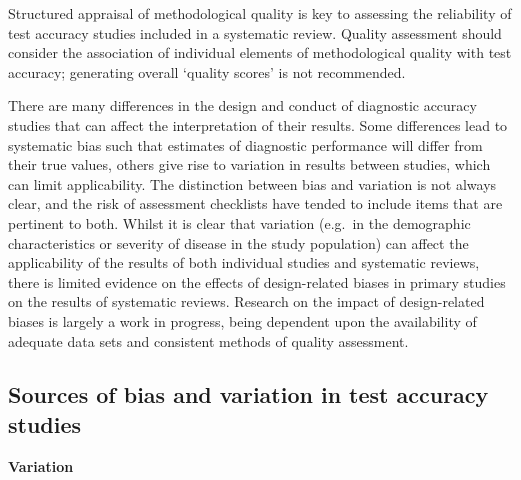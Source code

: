 \documentclass[
  11pt,
  a4paper,
  DIV=11,
  numbers=noendperiod]{scrreprt}
\begin{document}
Structured appraisal of methodological quality is key to assessing the
reliability of test accuracy studies included in a systematic review.
Quality assessment should consider the association of individual
elements of methodological quality with test accuracy; generating
overall `quality scores' is not recommended.

There are many differences in the design and conduct of diagnostic
accuracy studies that can affect the interpretation of their results.
Some differences lead to systematic bias such that estimates of
diagnostic performance will differ from their true values, others give
rise to variation in results between studies, which can limit
applicability. The distinction between bias and variation is not always
clear, and the risk of assessment checklists have tended to include
items that are pertinent to both. Whilst it is clear that variation
(e.g.~in the demographic characteristics or severity of disease in the
study population) can affect the applicability of the results of both
individual studies and systematic reviews, there is limited evidence on
the effects of design-related biases in primary studies on the results
of systematic reviews. Research on the impact of design-related biases
is largely a work in progress, being dependent upon the availability of
adequate data sets and consistent methods of quality assessment.

\subsection{Sources of bias and variation in test accuracy
studies}\label{sources-of-bias-and-variation-in-test-accuracy-studies}

\textbf{Variation}
\end{document}
